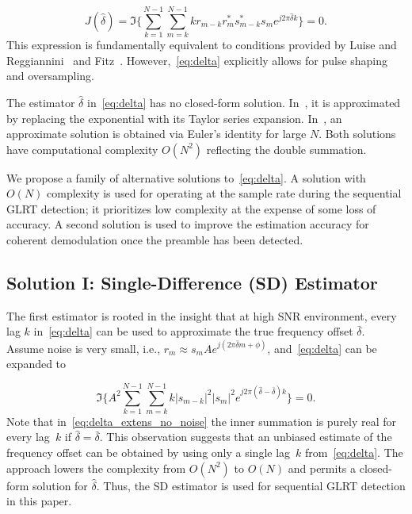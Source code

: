 \begin{equation}
    \label{eq:delta}
    J(\hat{\delta}) = \Im\bigg\{\sum_{k=1}^{N-1}{\sum_{m=k}^{N-1}{kr_{m-k}r_m^{*}s_{m-k}^{*}s_m}e^{j2\pi\hat{\delta}k}}\bigg\}=0.
    \end{equation}
This expression is fundamentally equivalent to conditions provided by Luise and Reggiannini~\cite{Luise_Reggiannini_95} and Fitz~\cite{Fitz_94}.
However,~\eqref{eq:delta} explicitly allows for pulse shaping and oversampling.

The estimator $\hat{\delta}$ in~\eqref{eq:delta} has no closed-form
solution.
In~\cite{Luise_Reggiannini_95}, it is approximated by replacing the exponential with its
Taylor series expansion.
In~\cite{Fitz_94}, an approximate solution is obtained via Euler's
identity for large $N$.
Both solutions have computational complexity $O(N^2)$ reflecting the
double summation.

We propose a family of alternative solutions to~\eqref{eq:delta}.
A solution with $O(N)$ complexity is used for operating at the sample
rate during the sequential GLRT detection;
it prioritizes low complexity at the expense of some loss of accuracy.
A second solution is used to improve the estimation accuracy for coherent demodulation once the preamble has been detected.

\subsection{Solution I: Single-Difference (SD) Estimator}

The first estimator is rooted in the insight that at high SNR environment, every lag $k$ in~\eqref{eq:delta} can be used to
approximate the true frequency offset $\bar{\delta}$. Assume noise is very small, i.e.,
$r_m \approx s_mAe^{j(2\pi \bar{\delta} m+\phi)}$, and~\eqref{eq:delta} can be expanded to

\begin{equation}
    \label{eq:delta_extens_no_noise}
    \Im\bigg\{A^2\sum_{k=1}^{N-1}\sum_{m=k}^{N-1}k|s_{m-k}|^2|s_m|^2e^{j2\pi (\hat{\delta}-\bar{\delta})k}\bigg\}=0.
    \end{equation}
Note that in~\eqref{eq:delta_extens_no_noise} the inner summation is purely real for every lag~$k$ if $\hat{\delta}=\bar{\delta}$.
This observation suggests that an unbiased estimate of the frequency offset can be obtained by using only a single lag~$k$
from~\eqref{eq:delta}. The approach lowers the complexity from $O(N^2)$ to $O(N)$ and permits a closed-form solution for $\hat{\delta}$.  
Thus, the SD estimator is used for sequential GLRT detection in this paper. 

